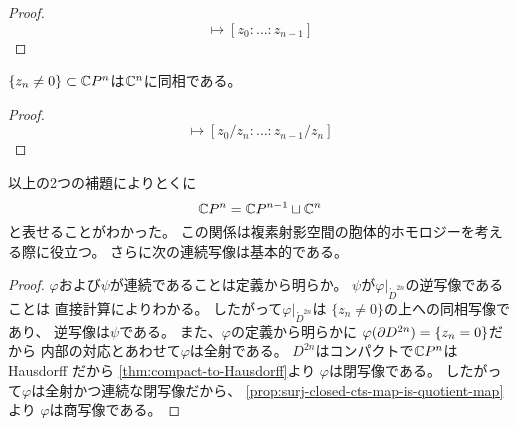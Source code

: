 \documentclass[report]{jlreq}
\begin{document}
\begin{proof}
    \begin{equation}
        [z_0 : \dots : z_{n - 1} : 0] \mapsto [z_0 : \dots : z_{n - 1}]
    \end{equation}
    \TODO{}
\end{proof}

\begin{lemma}
    $\{ z_n \neq 0 \} \subset \mathbb{C} P^n$は$\mathbb{C}^n$に同相である。
\end{lemma}

\begin{proof}
    \begin{equation}
        [z_0 : \dots : z_{n - 1} : z_n]
            \mapsto [z_0 / z_n : \dots : z_{n - 1} / z_n]
    \end{equation}
    \TODO{}
\end{proof}

以上の2つの補題によりとくに
\begin{equation}
    \mathbb{C} P^n = \mathbb{C} P^{n - 1} \sqcup \mathbb{C}^n
\end{equation}
と表せることがわかった。
この関係は複素射影空間の胞体的ホモロジーを考える際に役立つ。
さらに次の連続写像は基本的である。


\begin{proof}
    $\varphi$および$\psi$が連続であることは定義から明らか。
    $\psi$が$\varphi|_{\mathring{D}^{2n}}$の逆写像であることは
    直接計算によりわかる。
    したがって$\varphi|_{\mathring{D}^{2n}}$は
    $\{ z_n \neq 0 \}$の上への同相写像であり、
    逆写像は$\psi$である。
    また、$\varphi$の定義から明らかに
    $\varphi(\partial D^{2n}) = \{ z_n = 0 \}$だから
    内部の対応とあわせて$\varphi$は全射である。
    $D^{2n}$はコンパクトで$\mathbb{C} P^n$は Hausdorff だから
    \cref{thm:compact-to-Hausdorff}より
    $\varphi$は閉写像である。
    したがって$\varphi$は全射かつ連続な閉写像だから、
    \cref{prop:surj-closed-cts-map-is-quotient-map}より
    $\varphi$は商写像である。
\end{proof}
\end{document}
